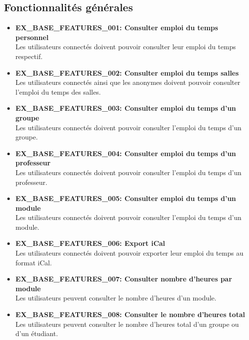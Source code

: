 \documentclass[a4paper,12pt]{article}
\begin{document}
\subsection{Fonctionnalités générales}

\begin{itemize}
    \item \textbf{EX\_BASE\_FEATURES\_001: Consulter emploi du temps personnel} \\
    Les utilisateurs connectés doivent pouvoir consulter leur emploi du temps respectif.

    \item \textbf{EX\_BASE\_FEATURES\_002: Consulter emploi du temps salles} \\
    Les utilisateurs connectés ainsi que les anonymes doivent pouvoir consulter l'emploi du temps des salles.

    \item \textbf{EX\_BASE\_FEATURES\_003: Consulter emploi du temps d'un groupe} \\
    Les utilisateurs connectés doivent pouvoir consulter l'emploi du temps d'un groupe.

    \item \textbf{EX\_BASE\_FEATURES\_004: Consulter emploi du temps d'un professeur} \\
    Les utilisateurs connectés doivent pouvoir consulter l'emploi du temps d'un professeur.

    \item \textbf{EX\_BASE\_FEATURES\_005: Consulter emploi du temps d'un module} \\
    Les utilisateurs connectés doivent pouvoir consulter l'emploi du temps d'un module.

    \item \textbf{EX\_BASE\_FEATURES\_006: Export iCal} \\
    Les utilisateurs connectés doivent pouvoir exporter leur emploi du temps au format iCal.

    \item \textbf{EX\_BASE\_FEATURES\_007: Consulter nombre d'heures par module} \\
    Les utilisateurs peuvent consulter le nombre d'heures d'un module.

    \item \textbf{EX\_BASE\_FEATURES\_008: Consulter le nombre d'heures total} \\
    Les utilisateurs peuvent consulter le nombre d'heures total d'un groupe ou d'un étudiant.


\end{itemize}
\end{document}
